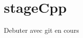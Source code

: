 \chapter{stage\+Cpp}
\hypertarget{md__r_e_a_d_m_e}{}\label{md__r_e_a_d_m_e}
\label{md__r_e_a_d_m_e_autotoc_md0}%
%


Debuter avec git en cours 